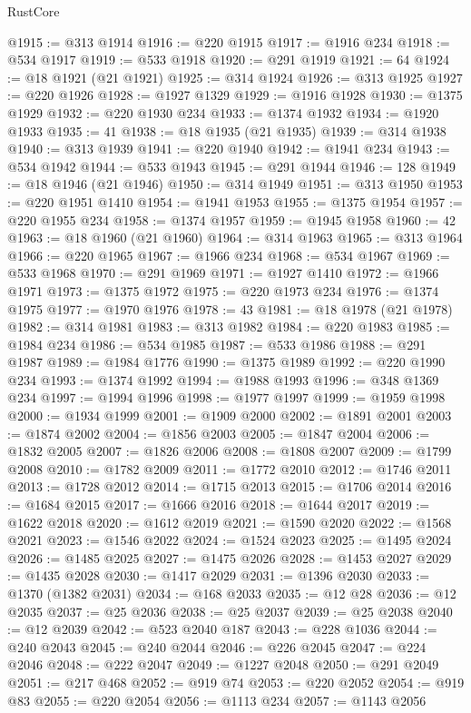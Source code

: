 \begin{lexlean}{RustCore}
\begin{coremodule}
@1915 := @313 @1914
@1916 := @220 @1915
@1917 := @1916 @234
@1918 := @534 @1917
@1919 := @533 @1918
@1920 := @291 @1919
@1921 := 64
@1924 := @18 @1921 (@21 @1921)
@1925 := @314 @1924
@1926 := @313 @1925
@1927 := @220 @1926
@1928 := @1927 @1329
@1929 := @1916 @1928
@1930 := @1375 @1929
@1932 := @220 @1930 @234
@1933 := @1374 @1932
@1934 := @1920 @1933
@1935 := 41
@1938 := @18 @1935 (@21 @1935)
@1939 := @314 @1938
@1940 := @313 @1939
@1941 := @220 @1940
@1942 := @1941 @234
@1943 := @534 @1942
@1944 := @533 @1943
@1945 := @291 @1944
@1946 := 128
@1949 := @18 @1946 (@21 @1946)
@1950 := @314 @1949
@1951 := @313 @1950
@1953 := @220 @1951 @1410
@1954 := @1941 @1953
@1955 := @1375 @1954
@1957 := @220 @1955 @234
@1958 := @1374 @1957
@1959 := @1945 @1958
@1960 := 42
@1963 := @18 @1960 (@21 @1960)
@1964 := @314 @1963
@1965 := @313 @1964
@1966 := @220 @1965
@1967 := @1966 @234
@1968 := @534 @1967
@1969 := @533 @1968
@1970 := @291 @1969
@1971 := @1927 @1410
@1972 := @1966 @1971
@1973 := @1375 @1972
@1975 := @220 @1973 @234
@1976 := @1374 @1975
@1977 := @1970 @1976
@1978 := 43
@1981 := @18 @1978 (@21 @1978)
@1982 := @314 @1981
@1983 := @313 @1982
@1984 := @220 @1983
@1985 := @1984 @234
@1986 := @534 @1985
@1987 := @533 @1986
@1988 := @291 @1987
@1989 := @1984 @1776
@1990 := @1375 @1989
@1992 := @220 @1990 @234
@1993 := @1374 @1992
@1994 := @1988 @1993
@1996 := @348 @1369 @234
@1997 := @1994 @1996
@1998 := @1977 @1997
@1999 := @1959 @1998
@2000 := @1934 @1999
@2001 := @1909 @2000
@2002 := @1891 @2001
@2003 := @1874 @2002
@2004 := @1856 @2003
@2005 := @1847 @2004
@2006 := @1832 @2005
@2007 := @1826 @2006
@2008 := @1808 @2007
@2009 := @1799 @2008
@2010 := @1782 @2009
@2011 := @1772 @2010
@2012 := @1746 @2011
@2013 := @1728 @2012
@2014 := @1715 @2013
@2015 := @1706 @2014
@2016 := @1684 @2015
@2017 := @1666 @2016
@2018 := @1644 @2017
@2019 := @1622 @2018
@2020 := @1612 @2019
@2021 := @1590 @2020
@2022 := @1568 @2021
@2023 := @1546 @2022
@2024 := @1524 @2023
@2025 := @1495 @2024
@2026 := @1485 @2025
@2027 := @1475 @2026
@2028 := @1453 @2027
@2029 := @1435 @2028
@2030 := @1417 @2029
@2031 := @1396 @2030
@2033 := @1370 (@1382 @2031)
@2034 := @168 @2033
@2035 := @12 @28
@2036 := @12 @2035
@2037 := @25 @2036
@2038 := @25 @2037
@2039 := @25 @2038
@2040 := @12 @2039
@2042 := @523 @2040 @187
@2043 := @228 @1036
@2044 := @240 @2043
@2045 := @240 @2044
@2046 := @226 @2045
@2047 := @224 @2046
@2048 := @222 @2047
@2049 := @1227 @2048
@2050 := @291 @2049
@2051 := @217 @468
@2052 := @919 @74
@2053 := @220 @2052
@2054 := @919 @83
@2055 := @220 @2054
@2056 := @1113 @234
@2057 := @1143 @2056

\end{coremodule}
\end{lexlean}
